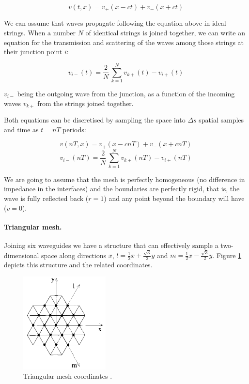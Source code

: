 \documentclass{article}
\begin{document}
\begin{equation}
v(t, x) = v_{+}(x - ct) + v_{-}(x + ct)
\end{equation}\label{eq:dalembert}

We can assume that waves propagate following the equation above
in ideal strings. When a number \(N\) of
identical strings is joined
together, we can write an equation for the transmission and
scattering of the waves among those strings at their junction
point \(i\):

\begin{equation}
v_{i-}(t) = \frac{2}{N}\,\sum_{k=1}^{N}v_{k+}(t)-v_{i+}(t)
\end{equation}\label{eq:losslessj}

\(v_{i-}\) being the outgoing wave from the junction, as a
function of the incoming waves \(v_{k+}\) from the strings
joined together.

Both equations can be discretised by sampling the space
into \(\Delta s\) spatial samples and time as \(t = nT\)
periods:

\begin{equation}
    v(nT, x) = v_{+}(x - cnT) + v_{-}(x + cnT)
\end{equation}\label{eq:discretewave}
\begin{equation}
    v_{i-}(nT) = \frac{2}{N}\,\sum_{k=1}^{N}v_{k+}(nT)-v_{i+}(nT)
\end{equation}\label{eq:discretelosslessj}

We are going to assume that the mesh is perfectly homogeneous
(no difference in impedance in the interfaces) and the boundaries
are perfectly rigid, that is, the wave is fully reflected back
(\(r = 1\))
and any point beyond the boundary will have (\(v = 0\)).


\paragraph{Triangular mesh.}

Joining six waveguides we have a structure that can effectively
sample a two-dimensional space along directions \(x\),
\(l = \frac{1}{2} x + \frac{\sqrt{3}}{2} y\) and
\(m = \frac{1}{2} x - \frac{\sqrt{3}}{2} y\). Figure
\ref{fig:coord} depicts this structure and the related coordinates.

\begin{figure}
    \centering
    \includegraphics[width=0.4\textwidth]{fig/fontanamesh}
    \caption{Triangular mesh coordinates \cite{fontana1998physical}.}\label{fig:coord}
\end{figure}
\end{document}
